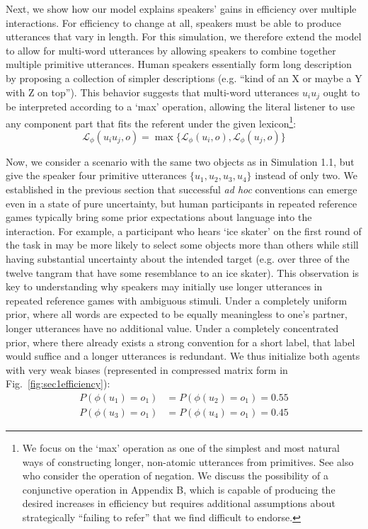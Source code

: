Next, we show how our model explains speakers' gains in efficiency over multiple interactions. 
For efficiency to change at all, speakers must be able to produce utterances that vary in length. 
For this simulation, we therefore extend the model to allow for multi-word utterances by allowing speakers to combine together multiple primitive utterances.
Human speakers essentially form long description by proposing a collection of simpler descriptions (e.g. ``kind of an X or maybe a Y with Z on top''). 
This behavior suggests that multi-word utterances $u_iu_j$ ought to be interpreted according to a `max' operation, allowing the literal listener to use any component part that fits the referent under the given lexicon\footnote{We focus on the `max' operation as one of the simplest and most natural ways of constructing longer, non-atomic utterances from primitives. See also  who consider the operation of negation. We discuss the possibility of a conjunctive operation in Appendix B, which is capable of producing the desired increases in efficiency but requires additional assumptions about strategically ``failing to refer'' that we find difficult to endorse.}:
$$\mathcal{L}_\phi(u_iu_j, o) = \max\{\mathcal{L}_\phi(u_i, o) , \mathcal{L}_\phi(u_j, o)\}$$

Now, we consider a scenario with the same two objects as in Simulation 1.1, but give the speaker four primitive utterances $\{u_1, u_2, u_3, u_4\}$ instead of only two. 
We established in the previous section that successful \emph{ad hoc} conventions can emerge even in a state of pure uncertainty, but human participants in repeated reference games typically bring some prior expectations about language into the interaction.
For example, a participant who hears `ice skater' on the first round of the task in  may be more likely to select some objects more than others while still having substantial uncertainty about the intended target (e.g. over three of the twelve tangram that have some resemblance to an ice skater).
This observation is key to understanding why speakers may initially use longer utterances in repeated reference games with ambiguous stimuli. 
Under a completely uniform prior, where all words are expected to be equally meaningless to one's partner, longer utterances have no additional value. 
Under a completely concentrated prior, where there already exists a strong convention for a short label, that label would suffice and a longer utterances is redundant.
We thus initialize both agents with very weak biases (represented in compressed matrix form in Fig.~\ref{fig:sec1efficiency}):
\begin{align}
P(\phi(u_1) = o_1) & = P(\phi(u_2) = o_1)  = 0.55\nonumber\\
    P(\phi(u_3) = o_1) & = P(\phi(u_4) = o_1)  = 0.45\nonumber
\end{align}

